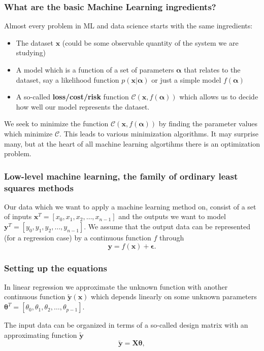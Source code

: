 \documentclass{beamer}
\begin{document}
\begin{frame}
\frametitle{What are the basic Machine Learning ingredients?}

\begin{block}{}
Almost every problem in ML and data science starts with the same ingredients:
\begin{itemize}
\item The dataset $\bm{x}$ (could be some observable quantity of the system we are studying)

\item A model which is a function of a set of parameters $\bm{\alpha}$ that relates to the dataset, say a likelihood  function $p(\bm{x}\vert \bm{\alpha})$ or just a simple model $f(\bm{\alpha})$

\item A so-called \textbf{loss/cost/risk} function $\mathcal{C} (\bm{x}, f(\bm{\alpha}))$ which allows us to decide how well our model represents the dataset. 
\end{itemize}

\noindent
We seek to minimize the function $\mathcal{C} (\bm{x}, f(\bm{\alpha}))$ by finding the parameter values which minimize $\mathcal{C}$. This leads to  various minimization algorithms. It may surprise many, but at the heart of all machine learning algortihms there is an optimization problem. 
\end{block}
\end{frame}

\begin{frame}
\frametitle{Low-level machine learning, the family of ordinary least squares methods}

Our data which we want to apply a machine learning method on, consist
of a set of inputs $\bm{x}^T=[x_0,x_1,x_2,\dots,x_{n-1}]$ and the
outputs we want to model $\bm{y}^T=[y_0,y_1,y_2,\dots,y_{n-1}]$.
We assume  that the output data can be represented (for a regression case) by a continuous function $f$
through
\[
\bm{y}=f(\bm{x})+\bm{\epsilon}.
\]
\end{frame}

\begin{frame}
\frametitle{Setting up the equations}

In linear regression we approximate the unknown function with another
continuous function $\tilde{\bm{y}}(\bm{x})$ which depends linearly on
some unknown parameters
$\bm{\theta}^T=[\theta_0,\theta_1,\theta_2,\dots,\theta_{p-1}]$.

The input data can be organized in terms of a so-called design matrix 
with an approximating function $\bm{\tilde{y}}$ 
\[
\bm{\tilde{y}}= \bm{X}\bm{\theta},
\]
\end{frame}
\end{document}
